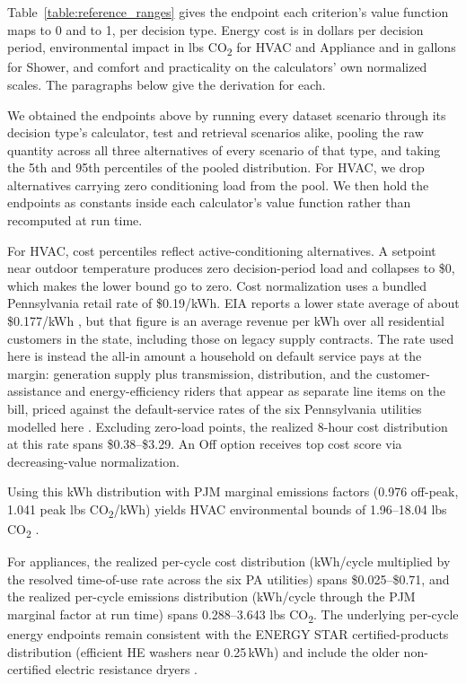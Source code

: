 \documentclass[final,3p,times]{elsarticle}
\begin{document}
Table~\ref{table:reference_ranges} gives the endpoint each criterion's value function maps to 0 and to 1, per decision type. Energy cost is in dollars per decision period, environmental impact in lbs CO\textsubscript{2} for HVAC and Appliance and in gallons for Shower, and comfort and practicality on the calculators' own normalized scales. The paragraphs below give the derivation for each.

We obtained the endpoints above by running every dataset scenario through its decision type's calculator, test and retrieval scenarios alike, pooling the raw quantity across all three alternatives of every scenario of that type, and taking the 5th and 95th percentiles of the pooled distribution. For HVAC, we drop alternatives carrying zero conditioning load from the pool. We then hold the endpoints as constants inside each calculator's value function rather than recomputed at run time.

For HVAC, cost percentiles reflect active-conditioning alternatives. A setpoint near outdoor temperature produces zero decision-period load and collapses to \$0, which makes the lower bound go to zero. Cost normalization uses a bundled Pennsylvania retail rate of \$0.19/kWh. EIA reports a lower state average of about \$0.177/kWh \cite{eia_faq_electricity2024}, but that figure is an average revenue per kWh over all residential customers in the state, including those on legacy supply contracts. The rate used here is instead the all-in amount a household on default service pays at the margin: generation supply plus transmission, distribution, and the customer-assistance and energy-efficiency riders that appear as separate line items on the bill, priced against the default-service rates of the six Pennsylvania utilities modelled here \cite{paupc2025}. Excluding zero-load points, the realized 8-hour cost distribution at this rate spans \$0.38--\$3.29. An Off option receives top cost score via decreasing-value normalization.

Using this kWh distribution with PJM marginal emissions factors (0.976 off-peak, 1.041 peak lbs CO\textsubscript{2}/kWh) yields HVAC environmental bounds of 1.96--18.04 lbs CO\textsubscript{2} \cite{pjm2022emissions}.


For appliances, the realized per-cycle cost distribution (kWh/cycle multiplied by the resolved time-of-use rate across the six PA utilities) spans \$0.025--\$0.71, and the realized per-cycle emissions distribution (kWh/cycle through the PJM marginal factor at run time) spans 0.288--3.643 lbs CO\textsubscript{2}. The underlying per-cycle energy endpoints remain consistent with the ENERGY STAR certified-products distribution (efficient HE washers near 0.25\,kWh) and include the older non-certified electric resistance dryers \cite{energystar_products,neep2015}.
\end{document}

